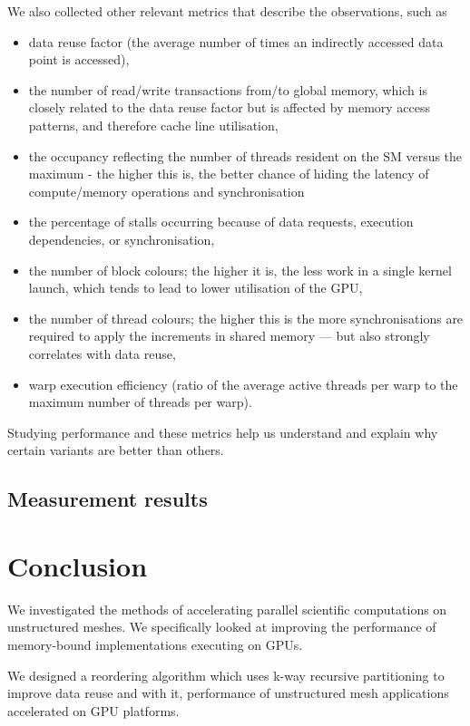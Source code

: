 We also collected other relevant metrics that describe the observations, such as 
\begin{itemize}
  \item data reuse factor (the average number of times an indirectly accessed
    data point is accessed),
  \item the number of read/write transactions from/to global memory, which is
    closely related to the data reuse factor but is affected by memory access
    patterns, and therefore cache line utilisation,
  \item the occupancy reflecting the number of threads resident on the SM versus
    the maximum - the higher this is, the better chance of hiding the latency of
    compute/memory operations and synchronisation
  \item the percentage of stalls occurring because of data requests, execution
    dependencies, or synchronisation,
   \item the number of block colours; the higher it is, the less work in a
     single kernel launch, which tends to lead to lower utilisation of the GPU,
  \item the number of thread colours; the higher this is the more
    synchronisations are required to apply the increments in shared memory ---
    but also strongly correlates with data reuse,
  \item warp execution efficiency (ratio of the average active threads per warp
    to the maximum number of threads per warp).
\end{itemize}
Studying performance and these metrics help us understand and explain why
certain variants are better than others.

\subsection{Measurement results}\label{measurement-results}



\section{Conclusion}\label{conclusion}

We investigated the methods of accelerating parallel scientific computations on
unstructured meshes. We specifically looked at improving the performance of
memory-bound implementations executing on GPUs.

We designed a reordering algorithm which uses k-way recursive partitioning to
improve data reuse and with it, performance of unstructured mesh applications
accelerated on GPU platforms.

